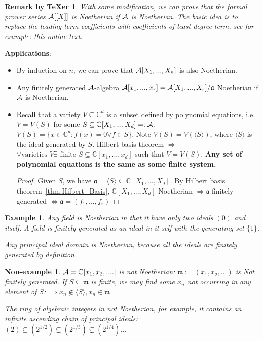 \documentclass[11pt]{article}
\newtheorem{rmkt}[thm]{Remark by TeXer}
\newtheorem{ex}[thm]{Example}
\newtheorem{nex}[thm]{Non-example}
\newcommand{\cplx}{\mathbb C}
\newcommand{\sca}{{\mathfrak a}}
\newcommand{\scm}{{\mathfrak m}}
\newcommand{\cala}{{\cal A}}
\newcommand{\Lrta}{\Longrightarrow}
\newcommand{\Llrta}{\Longleftrightarrow}
\newcommand{\lgl}{\langle}
\newcommand{\rgl}{\rangle}
\begin{document}
\begin{rmkt}
With some modification, we can prove that the formal prower series $\cala[[X]]$ is Noetherian if $\cala$ is Noetherian. The basic idea is to replace the leading term coefficients with coefficients of least degree term, see for example: \href{https://faculty.math.illinois.edu/~r-ash/Algebra/Chapter8.pdf}{this online text}.
\end{rmkt}

\textbf{Applications}:
\begin{itemize}
    \item By induction on $n$, we can prove that $\cala[X_1,...,X_n]$ is also Noetherian.
    \item 
    Any finitely generated $\cala$-algebra $\cala[x_1,...,x_r]=\cala[X_1,...,X_r]/\sca$ Noetherian if $\cala $ is Noetherian. 
    \item 
    Recall that  a variety $V\subseteq \cplx^d$ is a subset defined by polynomial equations, i.e.
    $V=V(S)$ for some $S\subseteq \cplx[X_1,...,X_d]=:\cala$. $V(S)=\{x\in \cplx^d:f(x)=0\forall f\in S\}$.
    Note $V(S)=V(\lgl S\rgl)$, where $\lgl S\rgl$ is the ideal generated by $S$. Hilbert basis theorem $\Lrta$ $\forall \text{varieties } V\exists \text{ finite } S\subseteq \cplx[x_1,...,x_d]$ such that $V=V(S)$. \textbf{Any set of polynomial equations is the same as some finite system.}
    \begin{proof}
    Given $S$, we have $\sca=\lgl S\rgl\subseteq\cplx[X_1,...,X_d]$. By Hilbert basis theorem~\ref{thm:Hilbert_Basis}, $\cplx[X_1,...,X_d] $ Noetherian $\Lrta\sca$ finitely generated $\Llrta\sca=(f_1,...,f_r)$
    \end{proof}
\end{itemize}
\begin{ex}
Any field is Noetherian in that it have only two ideals $(0) $ and itself. A field  is finitely generated as an ideal in it self with the generating set $\{1\}$.

Any principal ideal domain is Noetherian, because all the ideals are finitely generated by definition.
\end{ex}
\begin{nex}
$\cala=\cplx[x_1,x_2,....]$ is not Noetherian: $\scm:=(x_1,x_2,...)$ is Not finitely generated. If $S\subseteq \scm$ is finite, we may find some $x_n$ not occurring in any element of $S$: $\Lrta x_n\notin \lgl S\rgl, x_n\in \scm$.

The ring of algebraic integers in not Noetherian, for example, it contains an infinite ascending chain of principal ideals: $(2)\subsetneq (2^{1/2})\subsetneq (2^{1/3})\subsetneq (2^{1/4})...$
\end{nex}
\end{document}
